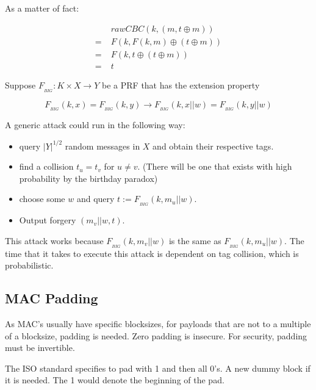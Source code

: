 \documentclass{article}
\begin{document}
\begin{multicols}{2}
As a matter of fact:

\[
\begin{aligned}
     &\;rawCBC(k,(m,t \oplus m))\\
    =&\;F(k, F(k,m) \oplus (t \oplus m)) \\
    =&\;F(k,t \oplus (t \oplus m)) \\
    =&\;t
\end{aligned}    
\]

Suppose $F_{_{BIG}}: K \times X \rightarrow Y$ be a PRF that has the extension property

$$
F_{_{BIG}}(k,x) = F_{_{BIG}}(k,y) \rightarrow F_{_{BIG}}(k,x||w) = F_{_{BIG}}(k,y||w)
$$

A generic attack could run in the following way:

\begin{itemize}
    \item query $|Y|^{1/2}$ random messages in $X$ and obtain their respective tags.
    \item find a collision $t_u = t_v$ for $u \neq v$. (There will be one that exists with high probability by the birthday paradox)
    \item choose some $w$ and query $t := F_{_{BIG}}(k, m_u || w)$.
    \item Output forgery $(m_v||w, t)$.
\end{itemize}

This attack works because $F_{_{BIG}}(k, m_v || w)$ is the same as $F_{_{BIG}}(k, m_u || w)$. The time that it takes to execute this attack is dependent on tag collision, which is probabilistic.

\subsection{MAC Padding}

As MAC's usually have specific blocksizes, for payloads that are not to a multiple of a blocksize, padding is needed. Zero padding is insecure. For security, padding must be invertible.

The ISO standard specifies to pad with 1 and then all 0's. A new dummy block if it is needed. The 1 would denote the beginning of the pad.

\end{multicols}
\end{document}
